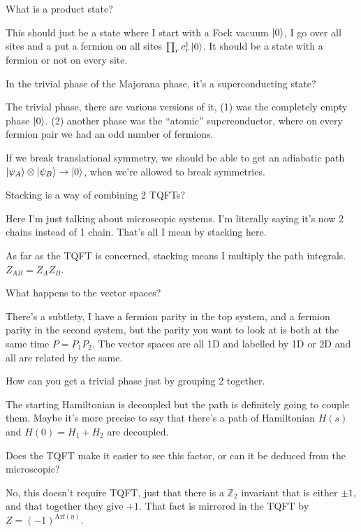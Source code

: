 \begin{question}
    What is a product state?
\end{question}
This should just be a state where I start with a Fock vacuum
$\ket{0}$,
I go over all sites and a put a fermion on all sites
$\prod_r c_r^\dagger \ket{0}$.
It should be a state with a fermion or not on every site.

\begin{question}
    In the trivial phase of the Majorana phase,
    it's a superconducting state?
\end{question}
The trivial phase,
there are various versions of it,
(1) was the completely empty phase $\ket{0}$.
(2) another phase was the ``atomic'' superconductor,
where on every fermion pair we had an odd number of fermions.

If we break translational symmetry,
we should be able to get an adiabatic path
$\ket{\psi_A}\otimes\ket{\psi_B} \to \ket{0}$,
when we're allowed to break symmetries.

\begin{question}
    Stacking is a way of combining 2 TQFTs?
\end{question}
Here I'm just talking about microscopic systems.
I'm literally saying it's now 2 chains instead of 1 chain.
That's all I mean by stacking here.

As far as the TQFT is concerned,
stacking means I multiply the path integrals.
$Z_{AB} = Z_A Z_B$.

\begin{question}
    What happens to the vector spaces?
\end{question}
There's a subtlety,
I have a fermion parity in the top system,
and a fermion parity in the second system,
but the parity you want to look at is both at the same time $P=P_1P_2$.
The vector spaces are all 1D and labelled by 1D or 2D and all are related by
the same.

\begin{question}
    How can you get a trivial phase just by grouping 2 together.
\end{question}
The starting Hamiltonian is decoupled but the path is definitely going to couple
them.
Maybe it's more precise to say that there's a path of Hamiltonian $H(s)$
and $H(0) = H_1 + H_2$ are decoupled.


\begin{question}
    Does the TQFT make it easier to see this factor,
    or can it be deduced from the microscopic?
\end{question}
No, this doesn't require TQFT, just that there is a $\mathbb{Z}_2$ invariant
that is either $\pm 1$,
and that together they give $+1$.
That fact is mirrored in the TQFT by $Z=(-1)^{\textrm{Arf}(\eta)}$.

